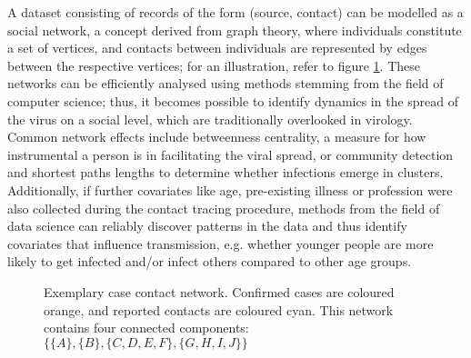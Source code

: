 A dataset consisting of records of the form (source, contact) can be modelled as a social network, a concept derived from graph theory, where individuals constitute a set of vertices, and contacts between individuals are represented by edges between the respective vertices; for an illustration, refer to figure \ref{fig:example_case_network}. These networks can be efficiently analysed using methods stemming from the field of computer science; thus, it becomes possible to identify dynamics in the spread of the virus on a social level, which are traditionally overlooked in virology. Common network effects include betweenness centrality, a measure for how instrumental a person is in facilitating the viral spread, or community detection and shortest paths lengths to determine whether infections emerge in clusters. Additionally, if further covariates like age, pre-existing illness or profession were also collected during the contact tracing procedure, methods from the field of data science can reliably discover patterns in the data and thus identify covariates that influence transmission, e.g. whether younger people are more likely to get infected and/or infect others compared to other age groups.

\begin{figure}
	\begin{mdframed}
		\centering
	\caption{Exemplary case contact network. Confirmed cases are coloured orange, and reported contacts are coloured cyan. This network contains four connected components: $\{\{A\},\{B\},\{C,D,E,F\},\{G,H,I,J\}\}$}
	\label{fig:example_case_network}
	\end{mdframed}
\end{figure}

